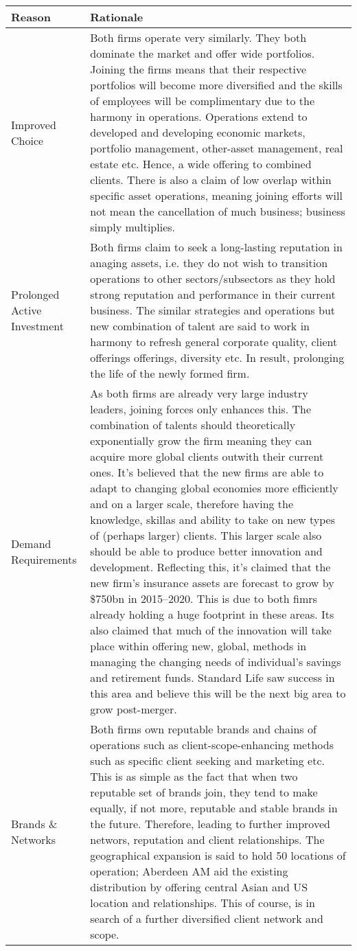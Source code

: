 \documentclass[11pt, english]{article}
\begin{document}
\begin{center}
        \scriptsize
\begin{longtable}{p{4cm}p{8.5cm}}
        \textbf{Reason} & \textbf{Rationale}\\
        \hline  
        Improved Choice & Both firms operate very similarly. They both dominate the market and offer wide portfolios. Joining the firms means that their respective portfolios will become more diversified and the skills of employees will be complimentary due to the harmony in operations. Operations extend to developed and developing economic markets, portfolio management, other-asset management, real estate etc. Hence, a wide offering to combined clients. There is also a claim of low overlap within specific asset operations, meaning joining efforts will not mean the cancellation of much business; business simply multiplies.\\
        Prolonged Active Investment & Both firms claim to seek a long-lasting reputation in anaging assets, i.e. they do not wish to transition operations to other sectors/subsectors as they hold strong reputation and performance in their current business. The similar strategies and operations but new combination of talent are said to work in harmony to refresh general corporate quality, client offerings offerings, diversity etc. In result, prolonging the life of the newly formed firm.\\
        Demand Requirements & As both firms are already very large industry leaders, joining forces only enhances this. The combination of talents should theoretically exponentially grow the firm meaning they can acquire more global clients outwith their current ones. It's believed that the new firms are able to adapt to changing global economies more efficiently and on a larger scale, therefore having the knowledge, skillas and ability to take on new types of (perhaps larger) clients. This larger scale also should be able to produce better innovation and development. Reflecting this, it's claimed that the new firm's insurance assets are forecast to grow by \$750bn in 2015--2020. This is due to both fimrs already holding a huge footprint in these areas. Its also claimed that much of the innovation will take place within offering new, global, methods in managing the changing needs of individual's savings and retirement funds. Standard Life saw success in this area and believe this will be the next big area to grow post-merger.\\
        Brands \& Networks & Both firms own reputable brands and chains of operations such as client-scope-enhancing methods such as specific client seeking and marketing etc. This is as simple as the fact that when two reputable set of brands join, they tend to make equally, if not more, reputable and stable brands in the future. Therefore, leading to further improved networs, reputation and client relationships. The geographical expansion is said to hold 50 locations of operation; Aberdeen AM aid the existing distribution by offering central Asian and US location and relationships. This of course, is in search of a further diversified client network and scope.\\

\end{longtable}
\end{center}
\end{document}
